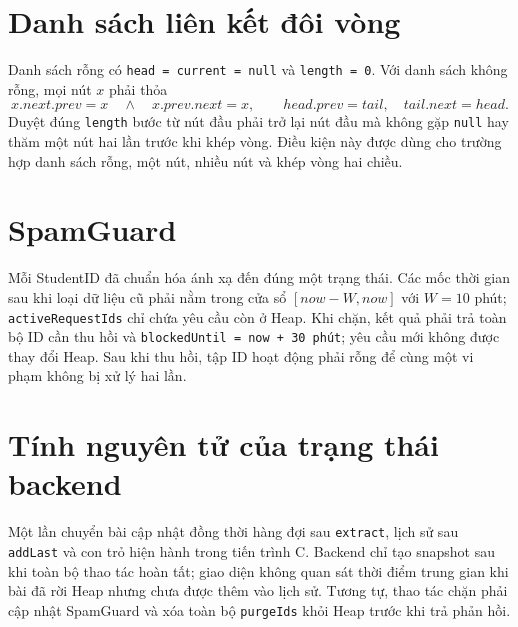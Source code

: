 \documentclass[12pt,a4paper,twoside,openright]{report}
\newcommand{\code}[1]{\texttt{#1}}
\begin{document}
\section{Danh sách liên kết đôi vòng}
Danh sách rỗng có \code{head = current = null} và \code{length = 0}. Với danh sách không
rỗng, mọi nút $x$ phải thỏa
\[
  x.next.prev=x\quad\land\quad x.prev.next=x,
  \qquad head.prev=tail,\quad tail.next=head.
\]
Duyệt đúng \code{length} bước từ nút đầu phải trở lại nút đầu mà không gặp \code{null} hay
thăm một nút hai lần trước khi khép vòng. Điều kiện này được dùng cho trường hợp danh sách
rỗng, một nút, nhiều nút và khép vòng hai chiều.

\section{SpamGuard}
Mỗi StudentID đã chuẩn hóa ánh xạ đến đúng một trạng thái. Các mốc thời gian sau khi loại
dữ liệu cũ phải nằm trong cửa sổ $[now-W,now]$ với $W=10$ phút;
\code{activeRequestIds} chỉ chứa yêu cầu còn ở Heap. Khi chặn, kết quả phải trả toàn bộ ID
cần thu hồi và \code{blockedUntil = now + 30 phút}; yêu cầu mới không được thay đổi Heap.
Sau khi thu hồi, tập ID hoạt động phải rỗng để cùng một vi phạm không bị xử lý hai lần.

\section{Tính nguyên tử của trạng thái backend}
Một lần chuyển bài cập nhật đồng thời hàng đợi sau \code{extract}, lịch sử sau
\code{addLast} và con trỏ hiện hành trong tiến trình C. Backend chỉ tạo snapshot sau khi
toàn bộ thao tác hoàn tất; giao diện không quan sát thời điểm trung gian khi bài đã rời
Heap nhưng chưa được thêm vào lịch sử. Tương tự, thao tác chặn phải cập nhật SpamGuard và
xóa toàn bộ \code{purgeIds} khỏi Heap trước khi trả phản hồi.
\end{document}
